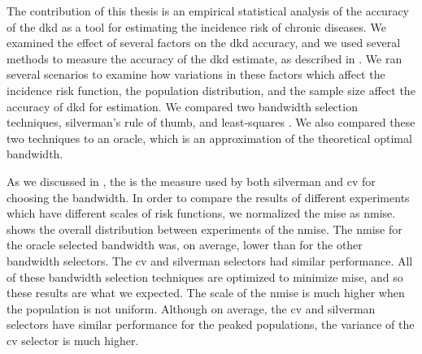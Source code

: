 

The contribution of this thesis is an empirical statistical analysis of the accuracy of the \gls{dkd}
as a tool for estimating the incidence risk of chronic diseases.
We examined the effect of several factors on the \gls{dkd} accuracy,
and we used several methods to measure the accuracy of the \gls{dkd} estimate,
as described in .
We ran several scenarios to examine how variations in these factors which affect the incidence risk function,
the population distribution, and the sample size affect the accuracy of \gls{dkd} for estimation.
We compared two bandwidth selection techniques, \gls{silverman}'s rule of thumb,
and least-squares .
We also compared these two techniques to an \gls{oracle},
which is an approximation of the theoretical optimal bandwidth.

As we discussed in ,
the  is the measure used by both \gls{silverman} and \gls{cv} for choosing the bandwidth.
In order to compare the results of different experiments which have different scales of \gls{risk} functions,
we normalized the \gls{mise} as \gls{nmise}. 
 shows the overall distribution between experiments of the \gls{nmise}.
The \gls{nmise} for the \gls{oracle} selected bandwidth was, on average,
lower than for the other bandwidth selectors.
The \gls{cv} and \gls{silverman} selectors had similar performance.
All of these bandwidth selection techniques are optimized to minimize \gls{mise},
and so these results are what we expected.
The scale of the \gls{nmise} is much higher when the population is not uniform.
Although on average, the \gls{cv} and \gls{silverman} selectors have similar performance for the peaked populations,
the variance of the \gls{cv} selector is much higher.

